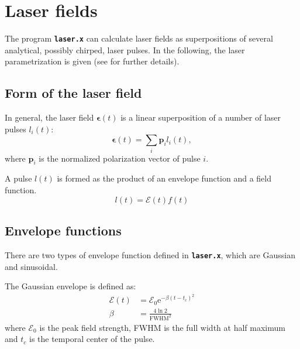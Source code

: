 \documentclass[a4paper,11pt,DIV=15,openany,twoside=false]{scrbook}
\newcommand{\ttt}[1]{\textbf{\texttt{#1}}}
\newcommand{\E}{\ensuremath{\mathrm{e}}}
\newcommand{\VEC}[1]{\ensuremath{\mathbf{#1}}}
\begin{document}
\section{Laser fields}\label{met:laser_field}

The program \ttt{laser.x} can calculate laser fields as superpositions of several analytical, possibly chirped, laser pulses. In the following, the laser parametrization is given (see \cite{Marquetand2007} for further details).

\subsection{Form of the laser field}

In general, the laser field $\boldsymbol{\epsilon}(t)$ is a linear superposition of a number of laser pulses $l_i(t)$:
\begin{equation}
  \boldsymbol{\epsilon}(t)=\sum\limits_i \VEC{p}_il_i(t),
\end{equation}
where $\VEC{p}_i$ is the normalized polarization vector of pulse $i$.

A pulse $l(t)$ is formed as the product of an envelope function and a field function. 
\begin{equation}
  l(t)=\mathcal{E}(t)f(t)
\end{equation}

\subsection{Envelope functions}

There are two types of envelope function defined in \ttt{laser.x}, which are Gaussian and sinusoidal.

The Gaussian envelope is defined as:
\begin{align}
  \mathcal{E}(t)&=\mathcal{E}_0 \E^{-\beta(t-t_c)^2}\label{eq:laser_gauss_1}\\
  \beta&=\frac{4\ln 2}{\mathrm{FWHM}^2}\label{eq:laser_gauss_2}
\end{align}
where $\mathcal{E}_0$ is the peak field strength, FWHM is the full width at half maximum and $t_c$ is the temporal center of the pulse.
\end{document}
